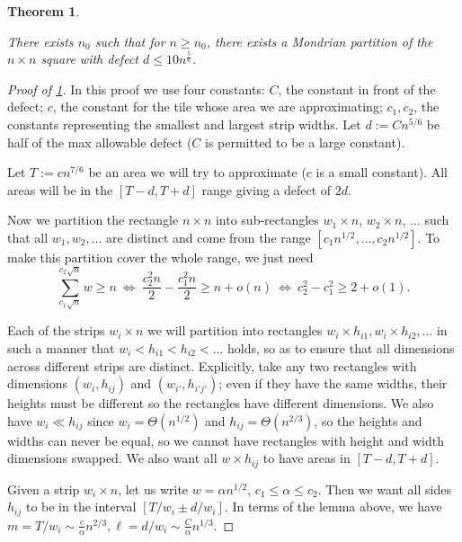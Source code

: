 \documentclass[10pt,a4paper]{amsart}
\newtheorem{theorem}{Theorem}
\begin{document}
\begin{theorem}\label{thm:main}

There exists $n_0$ such that for $n\geq n_0$, there exists a Mondrian partition of the $n\times n$ square with defect  $d\leq 10 n^\frac{5}{6}$.

\end{theorem}

\begin{proof}[Proof of \cref{thm:main}]
In this proof we use four constants: $C$, the constant in front of the defect; $c$, the constant for the tile whose area we are approximating; $c_1, c_2$, the constants representing the smallest and largest strip widths.
Let $d := Cn^{5/6}$ be half of the max allowable defect ($C$ is permitted to be a large constant).

Let $T := cn^{7/6}$ be an area we will try to approximate ($c$ is a small constant). All areas will be in the $[T - d, T + d]$ range giving a defect of $2d$.

Now we partition the rectangle $n \times n$ into sub-rectangles $w_1 \times n$, $w_2 \times n$, $\ldots$ such that all $w_1, w_2, \ldots$ are distinct and come from the range $[c_1 n^{1/2}, \ldots, c_2 n^{1/2}]$. To make this partition cover the whole range, we just need 
\[
\sum_{c_1\sqrt{n}}^{c_2\sqrt{n}}w\geq n\ 
\Leftrightarrow\ 
\frac{c_2^2n}{2}-\frac{c_1^2n}{2}\geq n+o(n)\ 
\Leftrightarrow\ 
c_2^2 - c_1^2 \geq 2 + o(1).
\]

Each of the strips $w_i \times n$ we will partition into rectangles $w_i \times h_{i1}, w_i \times h_{i2}, \ldots$ in such a manner that  $w_i < h_{i1} < h_{i2} < \ldots$ holds, so as to ensure that all dimensions across different strips are distinct. Explicitly, take any two rectangles with dimensions $(w_i,h_{ij})$ and $(w_{i'},h_{i'j'})$; even if they have the same widths, their heights must be different so the rectangles have different dimensions. We also have $w_i \ll h_{ij}$ since $w_i=\Theta(n^{1/2})$ and $h_{ij}=\Theta(n^{2/3})$, so the heights and widths can never be equal, so we cannot have rectangles with height and width dimensions swapped. We also want all $w \times h_{ij}$ to have areas in $[T - d, T + d]$.

Given a strip $w_i \times n$, let us write $w = \alpha n^{1/2}$, $c_1 \leq \alpha \leq c_2$. 
Then we want all sides $h_{ij}$ to be in the interval $[T/w_i \pm d/w_i]$. In terms of the lemma above, we have $m = T / w_i \sim \frac{c}{\alpha}n^{2/3}, \ell = d / w_i \sim \frac{C}{\alpha}n^{1/3} $.


\end{proof}
\end{document}
